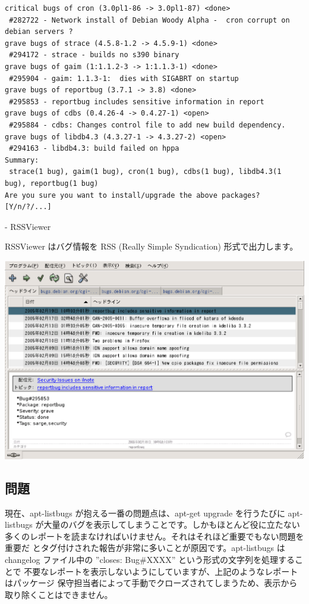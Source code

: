\documentclass[mingoth,a4paper]{jsarticle}
\begin{document}
\begin{verbatim}
critical bugs of cron (3.0pl1-86 -> 3.0pl1-87) <done>
 #282722 - Network install of Debian Woody Alpha -  cron corrupt on debian servers ?
grave bugs of strace (4.5.8-1.2 -> 4.5.9-1) <done>
 #294172 - strace - builds no s390 binary
grave bugs of gaim (1:1.1.2-3 -> 1:1.1.3-1) <done>
 #295904 - gaim: 1.1.3-1:  dies with SIGABRT on startup
grave bugs of reportbug (3.7.1 -> 3.8) <done>
 #295853 - reportbug includes sensitive information in report
grave bugs of cdbs (0.4.26-4 -> 0.4.27-1) <open>
 #295884 - cdbs: Changes control file to add new build dependency.
grave bugs of libdb4.3 (4.3.27-1 -> 4.3.27-2) <open>
 #294163 - libdb4.3: build failed on hppa
Summary:
 strace(1 bug), gaim(1 bug), cron(1 bug), cdbs(1 bug), libdb4.3(1 bug), reportbug(1 bug)
Are you sure you want to install/upgrade the above packages? [Y/n/?/...]
\end{verbatim}

- RSSViewer

RSSViewer はバグ情報を RSS (Really Simple Syndication) 形式で出力します。

\begin{center}
\includegraphics[scale=0.5]{image200510/rss.eps}
\end{center}

\subsection{問題}

現在、apt-listbugs が抱える一番の問題点は、apt-get upgrade を行うたびに
apt-listbugs が大量のバグを表示してしまうことです。しかもほとんど役に立たない
多くのレポートを読まなければいけません。それはそれほど重要でもない問題を重要だ
とタグ付けされた報告が非常に多いことが原因です。apt-listbugs は changelog
ファイル中の ''closes: Bug\#XXXX'' という形式の文字列を処理することで
不要なレポートを表示しないようにしていますが、上記のようなレポートはパッケージ
保守担当者によって手動でクローズされてしまうため、表示から取り除くことはできません。
\end{document}
